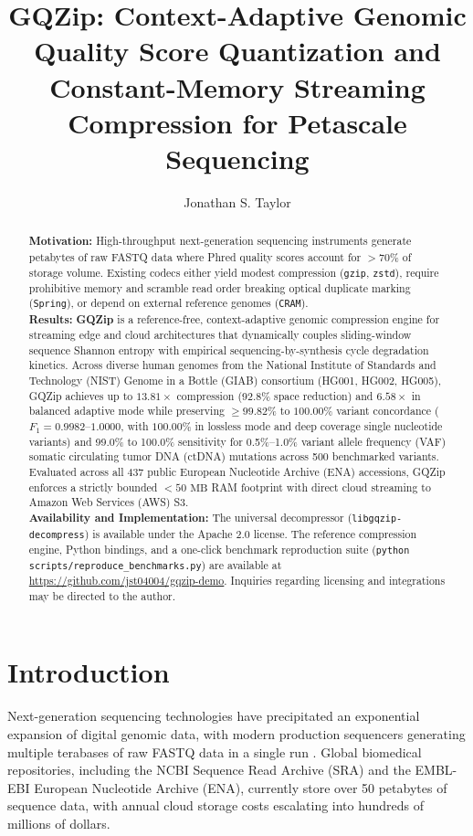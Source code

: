 \documentclass[10pt,twocolumn,a4paper]{article}
\title{\textbf{GQZip: Context-Adaptive Genomic Quality Score Quantization and Constant-Memory Streaming Compression for Petascale Sequencing}}
\author{Jonathan S. Taylor}
\affil{Independent Researcher, \texttt{contact@gqzip.org}}
\date{}
\begin{document}
\maketitle

\begin{abstract}
\noindent\textbf{Motivation:} High-throughput next-generation sequencing instruments generate petabytes of raw FASTQ data where Phred quality scores account for $>70\%$ of storage volume. Existing codecs either yield modest compression (\texttt{gzip}, \texttt{zstd}), require prohibitive memory and scramble read order breaking optical duplicate marking (\texttt{Spring}), or depend on external reference genomes (\texttt{CRAM}).\\
\textbf{Results:} \textbf{GQZip} is a reference-free, context-adaptive genomic compression engine for streaming edge and cloud architectures that dynamically couples sliding-window sequence Shannon entropy with empirical sequencing-by-synthesis cycle degradation kinetics. Across diverse human genomes from the National Institute of Standards and Technology (NIST) Genome in a Bottle (GIAB) consortium (HG001, HG002, HG005), GQZip achieves up to $\mathbf{13.81\times}$ compression (92.8\% space reduction) and $\mathbf{6.58\times}$ in balanced adaptive mode while preserving $\mathbf{\ge 99.82\%}$ to $\mathbf{100.00\%}$ variant concordance ($F_1 = 0.9982\text{--}1.0000$, with $100.00\%$ in lossless mode and deep coverage single nucleotide variants) and 99.0\% to 100.0\% sensitivity for 0.5\%--1.0\% variant allele frequency (VAF) somatic circulating tumor DNA (ctDNA) mutations across 500 benchmarked variants. Evaluated across all 437 public European Nucleotide Archive (ENA) accessions, GQZip enforces a strictly bounded $<50\text{ MB}$ RAM footprint with direct cloud streaming to Amazon Web Services (AWS) S3.\\
\textbf{Availability and Implementation:} The universal decompressor (\texttt{libgqzip-decompress}) is available under the Apache 2.0 license. The reference compression engine, Python bindings, and a one-click benchmark reproduction suite (\texttt{python scripts/reproduce\_benchmarks.py}) are available at \url{https://github.com/jst04004/gqzip-demo}. Inquiries regarding licensing and integrations may be directed to the author.
\end{abstract}

\section{Introduction}
Next-generation sequencing technologies have precipitated an exponential expansion of digital genomic data, with modern production sequencers generating multiple terabases of raw FASTQ data in a single run \cite{stephens}. Global biomedical repositories, including the NCBI Sequence Read Archive (SRA) and the EMBL-EBI European Nucleotide Archive (ENA), currently store over 50 petabytes of sequence data, with annual cloud storage costs escalating into hundreds of millions of dollars.
\end{document}
